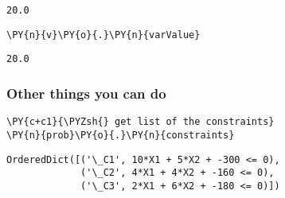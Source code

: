             \begin{tcolorbox}[breakable, size=fbox, boxrule=.5pt, pad at break*=1mm, opacityfill=0]
\begin{Verbatim}[commandchars=\\\{\}]
20.0
\end{Verbatim}
\end{tcolorbox}
        
    \begin{tcolorbox}[breakable, size=fbox, boxrule=1pt, pad at break*=1mm,colback=cellbackground, colframe=cellborder]
\begin{Verbatim}[commandchars=\\\{\}]
\PY{n}{v}\PY{o}{.}\PY{n}{varValue}
\end{Verbatim}
\end{tcolorbox}

            \begin{tcolorbox}[breakable, size=fbox, boxrule=.5pt, pad at break*=1mm, opacityfill=0]
\begin{Verbatim}[commandchars=\\\{\}]
20.0
\end{Verbatim}
\end{tcolorbox}
        
    \hypertarget{other-things-you-can-do}{%
\subsubsection{Other things you can do}\label{other-things-you-can-do}}

    \begin{tcolorbox}[breakable, size=fbox, boxrule=1pt, pad at break*=1mm,colback=cellbackground, colframe=cellborder]
\begin{Verbatim}[commandchars=\\\{\}]
\PY{c+c1}{\PYZsh{} get list of the constraints}
\PY{n}{prob}\PY{o}{.}\PY{n}{constraints}
\end{Verbatim}
\end{tcolorbox}

            \begin{tcolorbox}[breakable, size=fbox, boxrule=.5pt, pad at break*=1mm, opacityfill=0]
\begin{Verbatim}[commandchars=\\\{\}]
OrderedDict([('\_C1', 10*X1 + 5*X2 + -300 <= 0),
             ('\_C2', 4*X1 + 4*X2 + -160 <= 0),
             ('\_C3', 2*X1 + 6*X2 + -180 <= 0)])
\end{Verbatim}
\end{tcolorbox}
        

